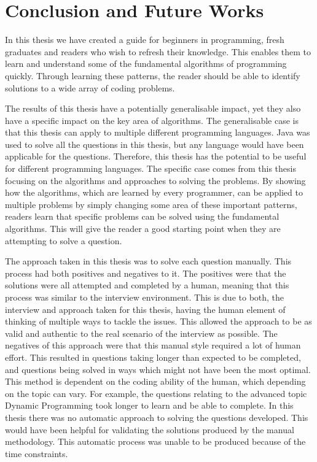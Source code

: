 \documentclass[10pt,twocolumn,hidelinks]{IEEEtran}
\begin{document}
\section{Conclusion and Future Works}
In this thesis we have created a guide for beginners in programming, fresh graduates and readers who wish to refresh their knowledge. This enables them to learn and understand some of the fundamental algorithms of programming quickly. Through learning these patterns, the reader should be able to identify solutions to a wide array of coding problems. 
\par The results of this thesis have a potentially generalisable impact, yet they also have a specific impact on the key area of algorithms. The generalisable case is that this thesis can apply to multiple different programming languages. Java was used to solve all the questions in this thesis, but any language would have been applicable for the questions. Therefore, this thesis has the potential to be useful for different programming languages. The specific case comes from this thesis focusing on the algorithms and approaches to solving the problems. By showing how the algorithms, which are learned by every programmer, can be applied to multiple problems by simply changing some area of these important patterns, readers learn that specific problems can be solved using the fundamental algorithms. This will give the reader a good starting point when they are attempting to solve a question.
\par The approach taken in this thesis was to solve each question manually. This process had both positives and negatives to it. The positives were that the solutions were all attempted and completed by a human, meaning that this process was similar to the interview environment. This is due to both, the interview and approach taken for this thesis, having the human element of thinking of multiple ways to tackle the issues. This allowed the approach to be as valid and authentic to the real scenario of the interview as possible.
The negatives of this approach were that this manual style required a lot of human effort. This resulted in questions taking longer than expected to be completed, and questions being solved in ways which might not have been the most optimal. This method is dependent on the coding ability of the human, which depending on the topic can vary. For example, the questions relating to the advanced topic Dynamic Programming took longer to learn and be able to complete.
 In this thesis there was no automatic approach to solving the questions developed. This would have been helpful for validating the solutions produced by the manual methodology. This automatic process was unable to be produced because of the time constraints. 
\end{document}
